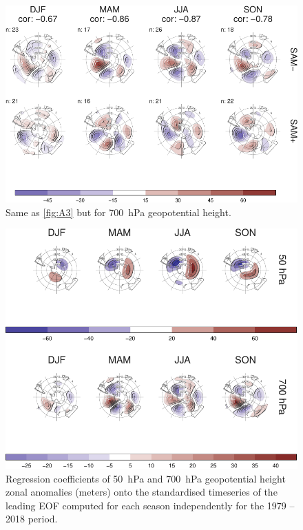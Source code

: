 \documentclass[smallextended]{svjour3}       %
\begin{document}
\begin{figure}
\includegraphics{A4-1} \caption{Same as \ref{fig:A3} but for 700~hPa geopotential height.}\label{fig:A4}
\end{figure}

\begin{figure}
\includegraphics{A5-1} \caption{Regression coefficients of 50~hPa and 700~hPa geopotential height zonal anomalies (meters) onto the standardised timeseries of the leading EOF computed for each season independently for the 1979 -- 2018 period.}\label{fig:A5}
\end{figure}
\end{document}
